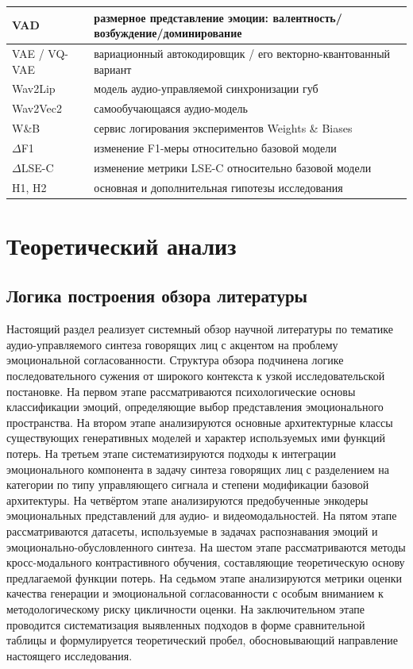 \documentclass[a4paper, 12pt, oneside, openany]{article}
\begin{document}
\begin{longtable}{|p{3.5cm}|p{12cm}|}
\hline
VAD & размерное представление эмоции: валентность/возбуждение/доминирование \\
\hline
VAE / VQ-VAE & вариационный автокодировщик / его векторно-квантованный вариант \\
\hline
Wav2Lip & модель аудио-управляемой синхронизации губ \\
\hline
Wav2Vec2 & самообучающаяся аудио-модель \\
\hline
W\&B & сервис логирования экспериментов Weights \& Biases \\
\hline
$\Delta$F1 & изменение F1-меры относительно базовой модели \\
\hline
$\Delta$LSE-C & изменение метрики LSE-C относительно базовой модели \\
\hline
H1, H2 & основная и дополнительная гипотезы исследования \\
\hline
\end{longtable}

\section{Теоретический анализ}

\subsection{Логика построения обзора литературы}

Настоящий раздел реализует системный обзор научной литературы по тематике аудио-управляемого синтеза говорящих лиц с акцентом на проблему эмоциональной согласованности. Структура обзора подчинена логике последовательного сужения от широкого контекста к узкой исследовательской постановке. На первом этапе рассматриваются психологические основы классификации эмоций, определяющие выбор представления эмоционального пространства. На втором этапе анализируются основные архитектурные классы существующих генеративных моделей и характер используемых ими функций потерь. На третьем этапе систематизируются подходы к интеграции эмоционального компонента в задачу синтеза говорящих лиц с разделением на категории по типу управляющего сигнала и степени модификации базовой архитектуры. На четвёртом этапе анализируются предобученные энкодеры эмоциональных представлений для аудио- и видеомодальностей. На пятом этапе рассматриваются датасеты, используемые в задачах распознавания эмоций и эмоционально-обусловленного синтеза. На шестом этапе рассматриваются методы кросс-модального контрастивного обучения, составляющие теоретическую основу предлагаемой функции потерь. На седьмом этапе анализируются метрики оценки качества генерации и эмоциональной согласованности с особым вниманием к методологическому риску цикличности оценки. На заключительном этапе проводится систематизация выявленных подходов в форме сравнительной таблицы и формулируется теоретический пробел, обосновывающий направление настоящего исследования.
\end{document}
